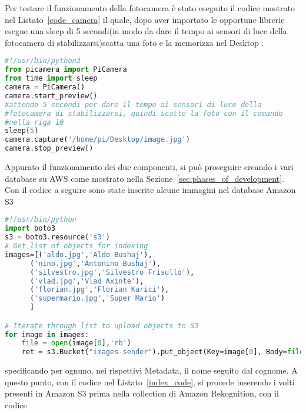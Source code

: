 Per testare il funzionamento della fotocamera è stato eseguito il codice mostrato nel Listato~\ref{code_camera} il quale, dopo aver importato le opportune librerie 
esegue una sleep di 5 secondi(in modo da dare il tempo ai sensori di luce della fotocamera di stabilizzarsi)scatta una foto e la memorizza nel Desktop .
\begin{lstlisting}[language=Python,frame=single,caption=Codice Python che scatta la foto,captionpos=t,label=code_camera]
#!/usr/bin/python3
from picamera import PiCamera
from time import sleep
camera = PiCamera()
camera.start_preview()
#attendo 5 secondi per dare il tempo ai sensori di luce della  
#fotocamera di stabilizzarsi, quindi scatto la foto con il comando
#nella riga 10
sleep(5)
camera.capture('/home/pi/Desktop/image.jpg')
camera.stop_preview()
\end{lstlisting}
Appurato il funzionamento dei due componenti, si può proseguire creando i vari database su AWS come mostrato nella Sezione~\ref{sec:phases_of_development}. 
Con il codice a seguire sono state inserite alcune immagini nel database Amazon S3
\begin{lstlisting}[language=Python,frame=single]
#!/usr/bin/python
import boto3
s3 = boto3.resource('s3')
# Get list of objects for indexing
images=[('aldo.jpg','Aldo Bushaj'),
      ('nino.jpg','Antonino Bushaj'),
      ('silvestro.jpg','Silvestro Frisullo'),
      ('vlad.jpg','Vlad Axinte'),
      ('florian.jpg','Florian Karici'),
      ('supermario.jpg','Super Mario')
      ]

# Iterate through list to upload objects to S3   
for image in images:
    file = open(image[0],'rb')
    ret = s3.Bucket("images-sender").put_object(Key=image[0], Body=file, Metadata={'FullName':image[1]})
\end{lstlisting}
specificando per ognuno, nei rispettivi Metadata, il nome seguito dal cognome.
A questo punto, con il codice nel Listato~\ref{index_code}, si procede inserendo i volti presenti in Amazon S3 prima nella collection di Amazon Rekognition, con il codice

